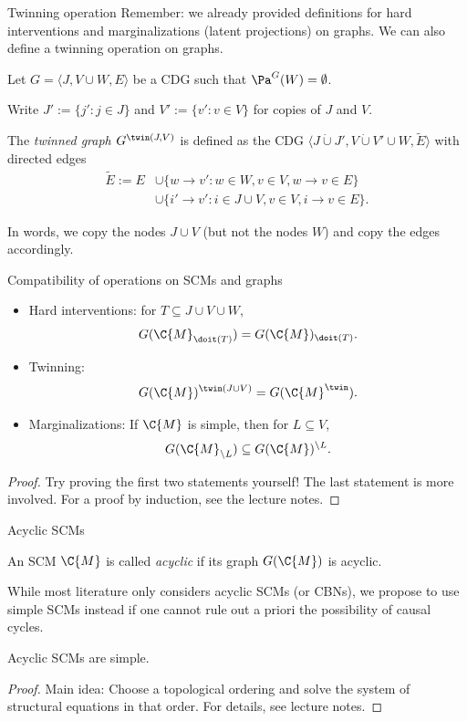 \begin{frame}{Twinning operation}
Remember: we already provided definitions for hard interventions and marginalizations (latent projections) on graphs.
We can also define a twinning operation on graphs.
\begin{Def}
  Let $G=\langle J,V \cup W,E\rangle$ be a CDG such that $\Pa^G(W) = \emptyset$.

  Write $J' := \{j' : j \in J\}$ and $V' := \{v' : v \in V\}$ for copies of $J$ and $V$.

  The \emph{twinned graph
  $G^{\twin(J,V)}$} is defined as the CDG $\langle J \dot\cup J', V \dot\cup V' \cup W, \tilde{E}\rangle$ with directed edges
  \begin{equation*}\begin{split}
    \tilde{E} := E & \cup \{w \to v' : w \in W, v \in V, w \to v \in E\} \\
                 & \cup \{i' \to v' : i \in J \cup V, v \in V, i \to v \in E\}.
  \end{split}\end{equation*}
\end{Def}
In words, we copy the nodes $J \cup V$ (but not the nodes $W$) and copy the edges accordingly.
\end{frame}

\begin{frame}{Compatibility of operations on SCMs and graphs}
  \begin{Prp}
  \begin{itemize}
    \item Hard interventions: for $T \subseteq J \cup V \cup W$,
      $$G(\C{M}_{\doit(T)}) = G(\C{M})_{\doit(T)}.$$
    \item Twinning:
      $$G(\C{M})^{\twin(J\cup V)} = G(\C{M}^\twin).$$
    \item Marginalizations: If $\C{M}$ is simple, then for $L \subseteq V$,
      $$G(\C{M}_{\setminus L}) \subseteq G(\C{M})^{\setminus L}.$$
  \end{itemize}
\end{Prp}
\begin{proof}
Try proving the first two statements yourself!
The last statement is more involved. For a proof by induction, see the lecture notes.
\end{proof}
\end{frame}

\begin{frame}{Acyclic SCMs}
\begin{Def}
  An SCM $\C{M}$ is called \emph{acyclic} if its graph $G(\C{M})$ is acyclic.
\end{Def}
  While most literature only considers acyclic SCMs (or CBNs), we propose to
  use simple SCMs instead if one cannot rule out a priori the possibility of causal cycles.
\begin{Prp}
  Acyclic SCMs are simple.
\end{Prp}
\begin{proof}
  Main idea: Choose a topological ordering and solve the system of structural equations in that order.
  For details, see lecture notes.
\end{proof}
\end{frame}

